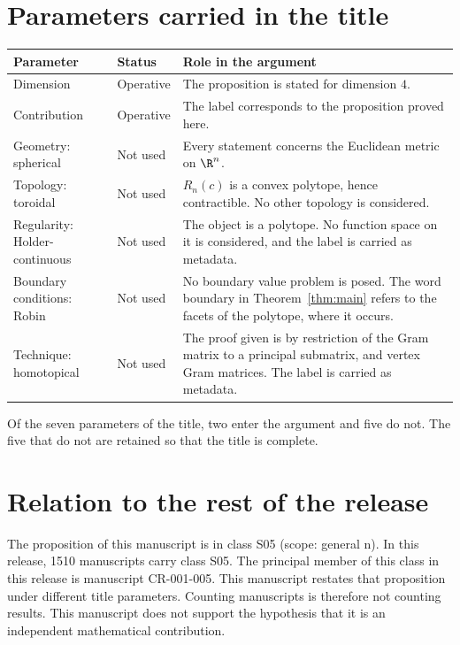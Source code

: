 \documentclass[11pt]{article}
\begin{document}
\section{Parameters carried in the title}\label{sec:params}
\begin{center}
\small
\begin{tabular}{p{}p{}p{}}
\toprule
Parameter & Status & Role in the argument \\
\midrule
Dimension & Operative & The proposition is stated for dimension $4$. \\
Contribution & Operative & The label corresponds to the proposition proved here. \\
Geometry: spherical & Not used & Every statement concerns the Euclidean metric on $\R^n$. \\
Topology: toroidal & Not used & $R_n(c)$ is a convex polytope, hence contractible. No other topology is considered. \\
Regularity: Holder-continuous & Not used & The object is a polytope. No function space on it is considered, and the label is carried as metadata. \\
Boundary conditions: Robin & Not used & No boundary value problem is posed. The word boundary in Theorem~\ref{thm:main} refers to the facets of the polytope, where it occurs. \\
Technique: homotopical & Not used & The proof given is by restriction of the Gram matrix to a principal submatrix, and vertex Gram matrices. The label is carried as metadata. \\
\bottomrule
\end{tabular}
\end{center}
Of the seven parameters of the title, two enter the argument and five do not. The five that do not are retained so that the title is complete.

\section{Relation to the rest of the release}
The proposition of this manuscript is in class S05 (scope: general n).
In this release, 1510 manuscripts carry class S05. The principal member of this class in this release is manuscript CR-001-005. This manuscript restates that proposition under different title parameters.
Counting manuscripts is therefore not counting results. This manuscript does not support the hypothesis that it is an independent mathematical contribution.
\end{document}
